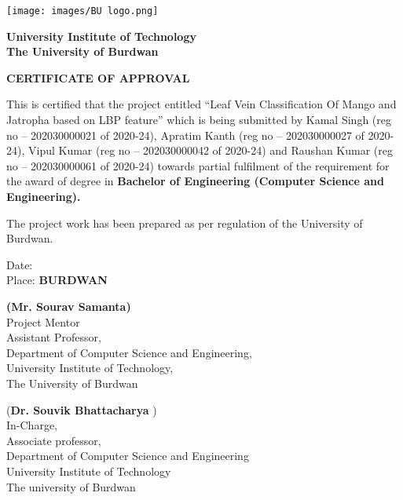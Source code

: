 \documentclass{report}
\begin{document}
\begin{titlepage}
    \centering
    \texttt{[image: images/BU logo.png]}\\ %
    \vspace{1cm}
    
    \textbf{University Institute of Technology}\\
    \textbf{The University of Burdwan}

    \vspace{1cm}
    
    \textbf{\huge CERTIFICATE OF APPROVAL }
    
    \vspace{0.5cm}
    
    \onehalfspacing
    \noindent
    \begin{justify} 
    This is certified that the project entitled “Leaf Vein Classification Of Mango and Jatropha based on LBP feature” which is being submitted by Kamal Singh (reg no – 202030000021 of 2020-24), Apratim Kanth  (reg no – 202030000027 of 2020-24), Vipul Kumar (reg no – 202030000042 of 2020-24) and Raushan Kumar (reg no – 202030000061 of 2020-24) towards partial fulfilment of the requirement for the award of degree in \textbf{Bachelor of Engineering (Computer Science and Engineering).}

The project work has been prepared as per regulation of the University of Burdwan.

    \end{justify}
    \vspace{1cm}
    
    \begin{flushleft}
        Date: \\
        Place: \textbf{BURDWAN}
    \end{flushleft}
    
    \vspace{0.5cm}

\noindent
\begin{minipage}[t]{0.45\textwidth}
    \raggedright
    \textbf{(Mr. Sourav Samanta)}\\  
    Project Mentor\\
    Assistant Professor,\\
    Department of
    Computer Science and Engineering,\\
    University Institute of Technology,\\
    The University of Burdwan
\end{minipage}
\hfill
\begin{minipage}[t]{0.45\textwidth}
    \raggedleft
  (\textbf{Dr. Souvik Bhattacharya} )\\  
In-Charge,\\  
Associate professor,\\  
Department of Computer Science and Engineering\\  
University Institute of Technology\\  
The university of Burdwan 
\end{minipage}

    
\end{titlepage}
\end{document}
